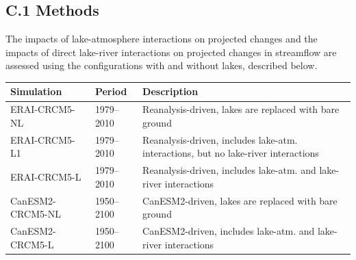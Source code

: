 \documentclass[a0,landscape]{a0poster}
\begin{document}
\begin{multicols*}{3}
\subsection*{C.1 Methods}
%
The impacts of lake-atmosphere interactions on
projected changes and the impacts of direct lake-river interactions on projected
changes in streamflow are assessed using the configurations with and without
lakes, described below.\\[0.5cm]

\begin{minipage}[t]{\linewidth}
\small
\begin{tabular}{lll}
\toprule
\textbf{Simulation} & \textbf{Period} & \textbf{Description}\\
\midrule
ERAI-CRCM5-NL     & 1979--2010 & Reanalysis-driven, lakes are replaced with bare ground \\
ERAI-CRCM5-L1     & 1979--2010 & Reanalysis-driven, includes lake-atm. interactions, but no lake-river interactions\\
ERAI-CRCM5-L      & 1979--2010 & Reanalysis-driven, includes lake-atm. and lake-river interactions\\
CanESM2-CRCM5-NL & 1950--2100 & CanESM2-driven, lakes are replaced with bare ground \\
CanESM2-CRCM5-L  & 1950--2100 & CanESM2-driven, includes lake-atm. and lake-river interactions \\
\bottomrule
\end{tabular}
\end{minipage}


\end{multicols*}
\end{document}

